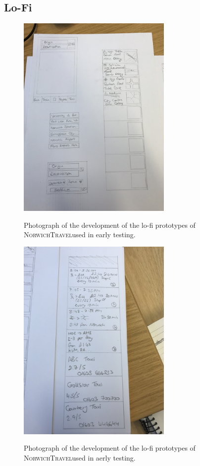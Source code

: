 \documentclass[cmpstyle]{ueacmpstyle}
\newcommand{\nt}{\textsc{NorwichTravel}}
\begin{document}
		\subsection{Lo-Fi} \label{app:lo-fi}
		\begin{figure}[h]
			\centering
			\includegraphics[height=10cm, angle=270]{images/lo-fi-1.jpg}\\
			\caption{Photograph of the development of the lo-fi prototypes of \nt used in early testing.}\label{fig:lo-fi-1}
		\end{figure}
		\begin{figure}[h!]
			\centering
			\includegraphics[height=10cm, angle=270]{images/lo-fi-2.jpg}\\
			\caption{Photograph of the development of the lo-fi prototypes of \nt used in aerly testing.}\label{fig:lo-fi-2}
		\end{figure}
		\clearpage
\end{document}
